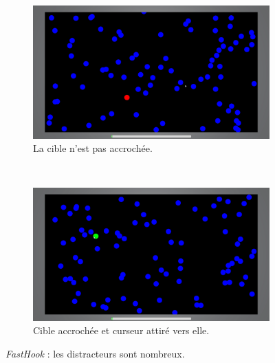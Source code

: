 	
	\begin{figure}[htbp]
		\begin{subfigure}[t]{0.49\textwidth}
			\centering
			\includegraphics[width=\textwidth]{figures/ch5/pseudohaptics_cursor_red}
			\caption{La cible n'est pas accrochée.}
			\label{fig:pseudohaptics_cursor_red}
		\end{subfigure}
		~
		\begin{subfigure}[t]{0.49\textwidth}
			\centering
			\includegraphics[width=\textwidth]{figures/ch5/pseudohaptics_cursor_green}
			\caption{Cible accrochée et curseur attiré vers elle.}
			\label{fig:pseudohaptics_cursor_green}
		\end{subfigure}
		\caption[Évaluation de \emph{FastHook}]{\emph{FastHook} : les distracteurs sont nombreux.}
		\label{fig:pseudohaptics}
	\end{figure}
	
